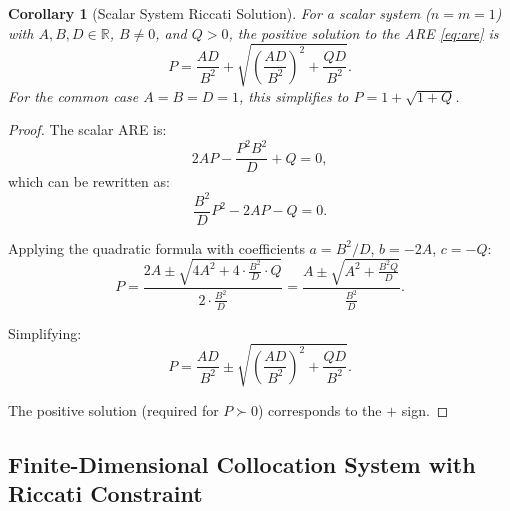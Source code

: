 \documentclass[11pt]{article}
\newtheorem{corollary}[theorem]{Corollary}
\newcommand{\real}{\mathbb{R}}
\begin{document}
\begin{corollary}[Scalar System Riccati Solution]
\label{cor:scalar_riccati}
For a scalar system ($n=m=1$) with $A, B, D \in \real$, $B \neq 0$, and $Q > 0$, the positive solution to the ARE \eqref{eq:are} is
\begin{equation}
P = \frac{AD}{B^2} + \sqrt{\left(\frac{AD}{B^2}\right)^2 + \frac{QD}{B^2}}.
\label{eq:scalar_riccati}
\end{equation}
For the common case $A = B = D = 1$, this simplifies to $P = 1 + \sqrt{1 + Q}$.
\end{corollary}

\begin{proof}
The scalar ARE is:
\[
2AP - \frac{P^2 B^2}{D} + Q = 0,
\]
which can be rewritten as:
\[
\frac{B^2}{D} P^2 - 2AP - Q = 0.
\]

Applying the quadratic formula with coefficients $a = B^2/D$, $b = -2A$, $c = -Q$:
\[
P = \frac{2A \pm \sqrt{4A^2 + 4 \cdot \frac{B^2}{D} \cdot Q}}{2 \cdot \frac{B^2}{D}} = \frac{A \pm \sqrt{A^2 + \frac{B^2 Q}{D}}}{\frac{B^2}{D}}.
\]

Simplifying:
\[
P = \frac{AD}{B^2} \pm \sqrt{\left(\frac{AD}{B^2}\right)^2 + \frac{QD}{B^2}}.
\]

The positive solution (required for $P \succ 0$) corresponds to the $+$ sign.
\end{proof}

\subsection{Finite-Dimensional Collocation System with Riccati Constraint}
\end{document}
